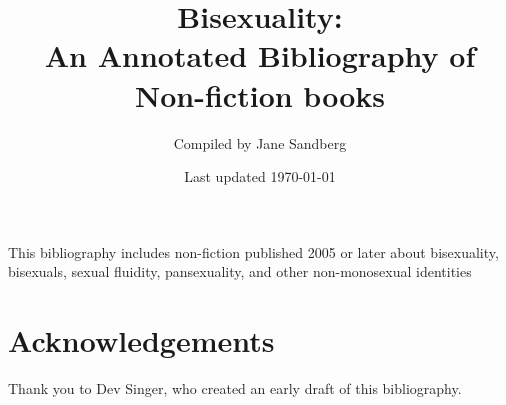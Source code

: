 \documentclass[12pt]{article}
\title{Bisexuality: \\An Annotated Bibliography of Non-fiction books}
\author{Compiled by Jane Sandberg}
\date{Last updated \today}
\begin{document}
\maketitle

 
 This bibliography includes non-fiction published 2005 or later about bisexuality, bisexuals, sexual fluidity, pansexuality, and other non-monosexual identities
 
 
 \newpage
 \tableofcontents

 
 \nocite{*}
 
 \printbibliography[title={General non-fiction},keyword={general},heading=bibnumbered]
 \printbibliography[title={Biography},keyword={biography},heading=bibnumbered]
 \printbibliography[title={Documentary films},keyword={documentary},heading=bibnumbered]
 
 \section{Acknowledgements}
 Thank you to Dev Singer, who created an early draft of this bibliography.
\end{document}
